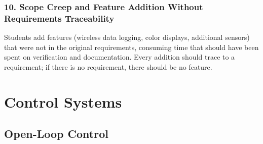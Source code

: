 \documentclass[11pt,letterpaper,twoside,openany]{book}
\begin{document}
\section*{10. Scope Creep and Feature Addition Without Requirements Traceability}
Students add features (wireless data logging, color displays, additional sensors) that were not in the original requirements, consuming time that should have been spent on verification and documentation. Every addition should trace to a requirement; if there is no requirement, there should be no feature.




\part{Control Systems}

\chapter{Open-Loop Control}
\label{ch:openloop}
\end{document}
